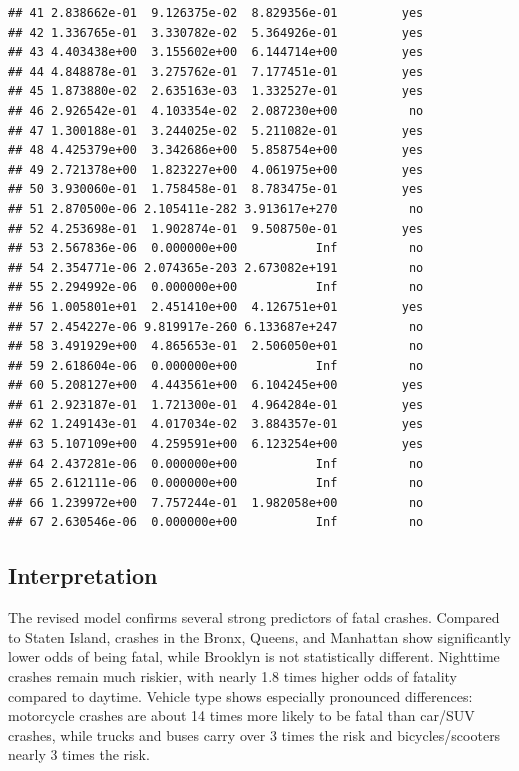 \documentclass[10pt]{article}\usepackage[]{graphicx}\usepackage[]{xcolor}
\makeatletter
\newenvironment{kframe}{%
 \def\at@end@of@kframe{}%
 \ifinner\ifhmode%
  \def\at@end@of@kframe{\end{minipage}}%
  \begin{minipage}{\columnwidth}%
 \fi\fi%
 \def\FrameCommand##1{\hskip\@totalleftmargin \hskip-\fboxsep
 \colorbox{shadecolor}{##1}\hskip-\fboxsep
     \hskip-\linewidth \hskip-\@totalleftmargin \hskip\columnwidth}%
 \MakeFramed {\advance\hsize-\width
   \@totalleftmargin\z@ \linewidth\hsize
   \@setminipage}}%
 {\par\unskip\endMakeFramed%
 \at@end@of@kframe}
\newenvironment{knitrout}{}{} %
\makeatother
\begin{document}
\begin{knitrout}
\begin{kframe}
\begin{verbatim}
## 41 2.838662e-01  9.126375e-02  8.829356e-01         yes
## 42 1.336765e-01  3.330782e-02  5.364926e-01         yes
## 43 4.403438e+00  3.155602e+00  6.144714e+00         yes
## 44 4.848878e-01  3.275762e-01  7.177451e-01         yes
## 45 1.873880e-02  2.635163e-03  1.332527e-01         yes
## 46 2.926542e-01  4.103354e-02  2.087230e+00          no
## 47 1.300188e-01  3.244025e-02  5.211082e-01         yes
## 48 4.425379e+00  3.342686e+00  5.858754e+00         yes
## 49 2.721378e+00  1.823227e+00  4.061975e+00         yes
## 50 3.930060e-01  1.758458e-01  8.783475e-01         yes
## 51 2.870500e-06 2.105411e-282 3.913617e+270          no
## 52 4.253698e-01  1.902874e-01  9.508750e-01         yes
## 53 2.567836e-06  0.000000e+00           Inf          no
## 54 2.354771e-06 2.074365e-203 2.673082e+191          no
## 55 2.294992e-06  0.000000e+00           Inf          no
## 56 1.005801e+01  2.451410e+00  4.126751e+01         yes
## 57 2.454227e-06 9.819917e-260 6.133687e+247          no
## 58 3.491929e+00  4.865653e-01  2.506050e+01          no
## 59 2.618604e-06  0.000000e+00           Inf          no
## 60 5.208127e+00  4.443561e+00  6.104245e+00         yes
## 61 2.923187e-01  1.721300e-01  4.964284e-01         yes
## 62 1.249143e-01  4.017034e-02  3.884357e-01         yes
## 63 5.107109e+00  4.259591e+00  6.123254e+00         yes
## 64 2.437281e-06  0.000000e+00           Inf          no
## 65 2.612111e-06  0.000000e+00           Inf          no
## 66 1.239972e+00  7.757244e-01  1.982058e+00          no
## 67 2.630546e-06  0.000000e+00           Inf          no
\end{verbatim}
\end{kframe}
\end{knitrout}

\subsection{Interpretation}
The revised model confirms several strong predictors of fatal crashes. Compared to Staten Island, crashes in the Bronx, Queens, and Manhattan show significantly lower odds of being fatal, while Brooklyn is not statistically different. Nighttime crashes remain much riskier, with nearly 1.8 times higher odds of fatality compared to daytime. Vehicle type shows especially pronounced differences: motorcycle crashes are about 14 times more likely to be fatal than car/SUV crashes, while trucks and buses carry over 3 times the risk and bicycles/scooters nearly 3 times the risk.
\end{document}
